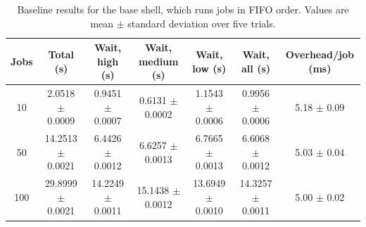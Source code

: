 \begin{table}[t]
\centering
\footnotesize
\caption{Baseline results for the base shell, which runs jobs in FIFO order. Values are mean $\pm$ standard deviation over five trials.}
\label{tab:baseline}
\begin{tabular}{|c|c|c|c|c|c|c|}
\hline
Jobs & Total (s) & Wait, high (s) & Wait, medium (s) & Wait, low (s) & Wait, all (s) & Overhead/job (ms) \\
\hline
10 & 2.0518 $\pm$ 0.0009 & 0.9451 $\pm$ 0.0007 & 0.6131 $\pm$ 0.0002 & 1.1543 $\pm$ 0.0006 & 0.9956 $\pm$ 0.0006 & 5.18 $\pm$ 0.09 \\
50 & 14.2513 $\pm$ 0.0021 & 6.4426 $\pm$ 0.0012 & 6.6257 $\pm$ 0.0013 & 6.7665 $\pm$ 0.0013 & 6.6068 $\pm$ 0.0012 & 5.03 $\pm$ 0.04 \\
100 & 29.8999 $\pm$ 0.0021 & 14.2249 $\pm$ 0.0011 & 15.1438 $\pm$ 0.0012 & 13.6949 $\pm$ 0.0010 & 14.3257 $\pm$ 0.0011 & 5.00 $\pm$ 0.02 \\
\hline
\end{tabular}
\end{table}
